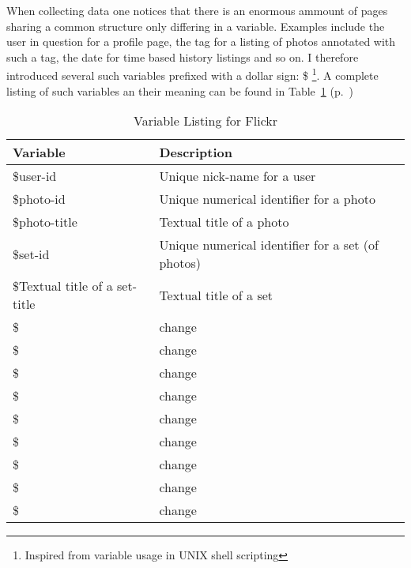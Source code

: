 \documentclass[12pt,a4paper]{article}
\begin{document}
When collecting data one notices that there is an enormous ammount of pages
sharing a common structure only differing in a variable. Examples include
the user in question for a profile page, the tag for a listing of photos
annotated with such a tag, the date for time based history listings and so on.
I therefore introduced several such variables prefixed with a dollar sign: \$
\footnote{Inspired from variable usage in UNIX shell scripting}. A complete
listing of such variables an their meaning can be found in
Table~\ref{table:flickr.variable.list}
(p.~\pageref{table:flickr.variable.list})

\begin{table}[h!b!p!]
  \caption{Variable Listing for Flickr}
  \label{table:flickr.variable.list}
  \begin{center}
    \begin{tabular}{l|l}

      Variable &
      Description \\

      \hline

      \$user-id &
      Unique nick-name for a user \\

      \$photo-id &
      Unique numerical identifier for a photo \\

      \$photo-title &
      Textual title of a photo \\

      \$set-id &
      Unique numerical identifier for a set (of photos) \\

      \$Textual title of a set-title &
      Textual title of a set \\

      \$ &
      change \\

      \$ &
      change \\

      \$ &
      change \\

      \$ &
      change \\

      \$ &
      change \\

      \$ &
      change \\

      \$ &
      change \\

      \$ &
      change \\

      \$ &
      change \\


    \end{tabular}
  \end{center}
\end{table}
\end{document}
